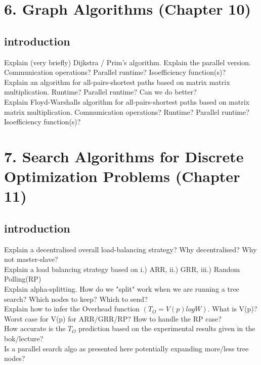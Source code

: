 \documentclass[a4paper,10pt,titlepage]{report}
\begin{document}
\section{
6. Graph Algorithms (Chapter 10)}
\subsection{introduction}


   Explain (very briefly) Dijkstra / Prim's algorithm. Explain the parallel version. Communication operations? Parallel runtime?
   Isoefficiency function(s)?\\

   Explain an algorithm for all-pairs-shortest paths based on matrix matrix multiplication. Runtime? Parallel runtime? Can we do better?\\

   Explain Floyd-Warshalls algorithm for all-pairs-shortest paths based on matrix matrix multiplication. Communication operations?
   Runtime? Parallel runtime? Isoefficiency function(s)? \\
   


    
    
    
    
    
    
    
    \newpage
\section{
7. Search Algorithms for Discrete Optimization Problems (Chapter 11)}
\subsection{introduction}
   Explain a decentralised overall load-balancing strategy? Why decentralised? Why not master-slave? \\
   Explain a load balancing strategy based on i.) ARR, ii.) GRR, iii.) Random Polling(RP)\\
   Explain alpha-splitting. How do we "split" work when we are running a tree search? Which nodes to keep? Which to send?\\
   Explain how to infer the Overhead function $(T_O = V(p) log W)$. What is V(p)?\\
   Worst case for V(p) for ARR/GRR/RP? How to handle the RP case?\\
   How accurate is the $T_O$ prediction based on the experimental results given in the bok/lecture?\\
   Is a parallel search algo as presented here potentially expanding more/less tree nodes?\\
\end{document}
